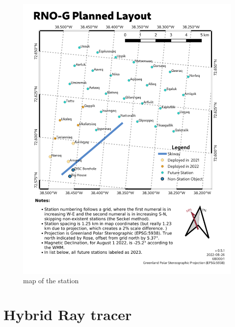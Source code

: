 \documentclass[11pt,a4paper,faculty=we,language=en,doctype=report]{cls/ugent-doc}
\begin{document}
\begin{figure}
	\includegraphics[width=\textwidth]{figures/station-map.png}	
	\caption{map of the station}
	\label{fig:station map}
\end{figure}

\chapter{Hybrid Ray tracer}
\end{document}
